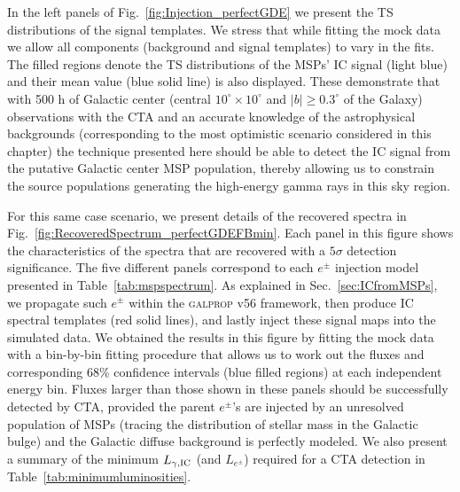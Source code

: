 \documentclass[doublespace,nopageskip]{VTthesis}
\begin{document}
In the left panels of Fig.~\ref{fig:Injection_perfectGDE} we present the TS distributions of the signal templates. We stress that while fitting the mock data we allow all components (background and signal templates) to vary in the fits. The filled regions denote the TS distributions of the MSPs' IC signal (light blue) and their mean value (blue solid line) is also displayed. These demonstrate that with 500 h of Galactic center (central $10^\circ\times10^\circ$ and $|b|\geq0.3^\circ$ of the Galaxy)  observations 
with the CTA
and an accurate knowledge of the astrophysical backgrounds (corresponding to the most optimistic scenario considered in this chapter) the technique presented here should be able to detect the IC signal from the putative Galactic center MSP population, thereby allowing us to constrain the source populations generating the high-energy gamma rays in this sky region.

For this same case scenario, we present details of the recovered spectra in Fig.~\ref{fig:RecoveredSpectrum_perfectGDEFBmin}. Each panel in this figure shows the characteristics of the spectra that are recovered with a $5\sigma$ detection significance. The five different panels correspond to each $e^\pm$ injection model presented in Table~\ref{tab:mspspectrum}. As explained in Sec.~\ref{sec:ICfromMSPs}, we propagate such $e^\pm$ within the \textsc{galprop} v56 framework, then produce IC spectral templates (red solid lines), and lastly inject these signal maps into the simulated data. We obtained the results in this figure by fitting the mock data with a bin-by-bin fitting procedure that allows us to work out the fluxes and corresponding 68\% confidence intervals (blue filled regions) at each independent energy bin. Fluxes larger than those shown in these panels should be successfully detected by CTA, provided the parent $e^\pm$'s are injected by an unresolved population of MSPs (tracing the distribution of stellar mass in the Galactic bulge) and the Galactic diffuse background is perfectly modeled. We also present a summary of the minimum $L_{\gamma,{\rm IC}}$ (and $L_{e^\pm}$) 
required for a CTA detection in Table~\ref{tab:minimumluminosities}.
\end{document}
